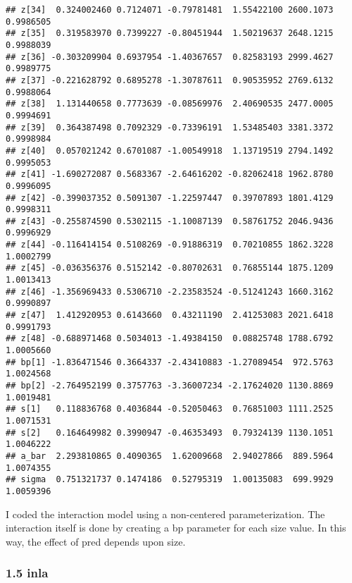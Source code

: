 \documentclass[
]{article}
\begin{document}
\begin{verbatim}
## z[34]  0.324002460 0.7124071 -0.79781481  1.55422100 2600.1073 0.9986505
## z[35]  0.319583970 0.7399227 -0.80451944  1.50219637 2648.1215 0.9988039
## z[36] -0.303209904 0.6937954 -1.40367657  0.82583193 2999.4627 0.9989775
## z[37] -0.221628792 0.6895278 -1.30787611  0.90535952 2769.6132 0.9988064
## z[38]  1.131440658 0.7773639 -0.08569976  2.40690535 2477.0005 0.9994691
## z[39]  0.364387498 0.7092329 -0.73396191  1.53485403 3381.3372 0.9998984
## z[40]  0.057021242 0.6701087 -1.00549918  1.13719519 2794.1492 0.9995053
## z[41] -1.690272087 0.5683367 -2.64616202 -0.82062418 1962.8780 0.9996095
## z[42] -0.399037352 0.5091307 -1.22597447  0.39707893 1801.4129 0.9998311
## z[43] -0.255874590 0.5302115 -1.10087139  0.58761752 2046.9436 0.9996929
## z[44] -0.116414154 0.5108269 -0.91886319  0.70210855 1862.3228 1.0002799
## z[45] -0.036356376 0.5152142 -0.80702631  0.76855144 1875.1209 1.0013413
## z[46] -1.356969433 0.5306710 -2.23583524 -0.51241243 1660.3162 0.9990897
## z[47]  1.412920953 0.6143660  0.43211190  2.41253083 2021.6418 0.9991793
## z[48] -0.688971468 0.5034013 -1.49384150  0.08825748 1788.6792 1.0005660
## bp[1] -1.836471546 0.3664337 -2.43410883 -1.27089454  972.5763 1.0024568
## bp[2] -2.764952199 0.3757763 -3.36007234 -2.17624020 1130.8869 1.0019481
## s[1]   0.118836768 0.4036844 -0.52050463  0.76851003 1111.2525 1.0071531
## s[2]   0.164649982 0.3990947 -0.46353493  0.79324139 1130.1051 1.0046222
## a_bar  2.293810865 0.4090365  1.62009668  2.94027866  889.5964 1.0074355
## sigma  0.751321737 0.1474186  0.52795319  1.00135083  699.9929 1.0059396
\end{verbatim}

I coded the interaction model using a non-centered parameterization. The
interaction itself is done by creating a bp parameter for each size
value. In this way, the effect of pred depends upon size.

\hypertarget{inla-4}{%
\subsubsection{1.5 inla}\label{inla-4}}
\end{document}
